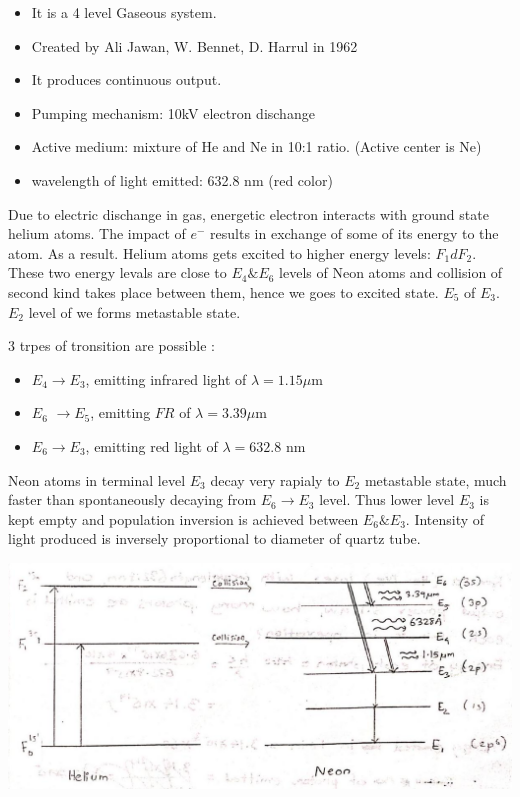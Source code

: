 \documentclass[12pt, a4paper]{article}
\begin{document}

\begin{itemize}
	\item It is a 4 level Gaseous system.
	\item Created by Ali Jawan, W. Bennet, D. Harrul in 1962
	\item It produces continuous output.
	\item Pumping mechanism: 10kV electron dischange
	\item Active medium: mixture of He and Ne in 10:1 ratio. (Active center is Ne)
	\item wavelength of light emitted: 632.8 nm (red color)
\end{itemize}

Due to electric dischange in gas, energetic electron interacts with ground state helium atoms. The impact of $e^{-}$ results in exchange of some of its energy to the atom. As a result. Helium atoms gets excited to higher energy levels: $F_{1} d F_{2}$. These two energy levals are close to $E_{4} \& E_{6}$ levels of Neon atoms and collision of second kind takes place between them, hence we goes to excited state. $E_{5}$ of $E_{3}$. $E_2$ level of we forms metastable state.

3 trpes of tronsition are possible :

\begin{itemize}
	\item $E_{4} \rightarrow E_{3}$, emitting infrared light of $\lambda=1.15 \mu \mathrm{m}$
	\item $E_6$ $\rightarrow E_5$, emitting $F R$ of $\lambda = 3.39 \mu \mathrm{m}$
	\item $E_6 \rightarrow E_3$, emitting red light of $\lambda = 632.8$ nm
\end{itemize}

Neon atoms in terminal level $E_{3}$ decay very rapialy to $E_{2}$ metastable state, much faster than spontaneously decaying from $E_{6} \rightarrow E_{3}$ level. Thus lower level $E_3$ is kept empty and population inversion is achieved between $E_{6} \& E_{3}$. Intensity of light produced is inversely proportional to diameter of quartz tube.

\begin{center}
	\includegraphics[max width=\textwidth]{2024_06_16_30d750483617f1939202g-04}
\end{center}
\end{document}
